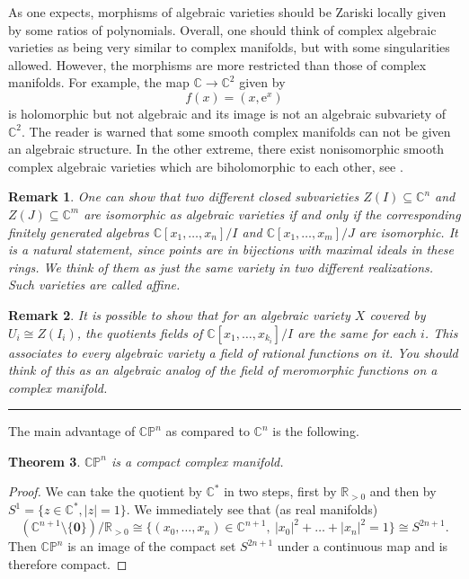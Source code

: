 \documentclass[11pt]{article}
\numberwithin{equation}{section}
\numberwithin{footnote}{section}
\newtheorem{thm}{Theorem}[section]
\newtheorem{rem}[thm]{Remark}
\newcommand{\blue}{\color{blue}}
\newcommand{\red}{\color{red}}
\newcommand{\ee}{{\mathrm e}}
\renewcommand{\P}{{\mathbb P}}
\newcommand{\R}{{\mathbb R}}
\newcommand{\C}{{\mathbb C}}
\begin{document}
\smallskip
As one expects, morphisms of algebraic varieties should be Zariski locally given by some ratios of polynomials. Overall, one should think of complex algebraic varieties as being very similar to complex manifolds, but with some singularities allowed. 
However, the morphisms are more restricted than those of complex manifolds. For example, the map $\C\to \C^2$ given by
$$
f(x) = (x,\ee^x)
$$
is holomorphic but not algebraic and its image is not an algebraic subvariety of $\C^2$. {\red The reader is warned that some smooth complex manifolds can not be given an algebraic structure. In the other extreme, there exist nonisomorphic smooth complex algebraic varieties which are biholomorphic to each other, see \cite{Hartshorne}.}

\smallskip
\begin{rem}
One can show that two different closed subvarieties $Z(I)\subseteq \C^n$ and $Z(J)\subseteq \C^m$ are isomorphic 
as algebraic varieties if and only if the corresponding finitely generated algebras $\C[x_1,\ldots,x_n]/I$ and $\C[x_1,\ldots, x_m]/J$ are isomorphic. It is a natural statement, since points are in bijections with maximal ideals in these rings.  
We think of them as just the same variety in two different realizations. Such varieties are called {\blue affine}.
\end{rem}

\smallskip
\begin{rem}
It is possible to show that for an algebraic variety $X$ covered by $U_i\cong Z(I_i)$, the quotients fields
of $\C[x_1,\ldots,x_{k_i}]/I$ are the same for each $i$. This associates to every algebraic variety a field of rational functions on it. You should think of this as an algebraic analog of the field of meromorphic functions on a complex manifold.
\end{rem}

\smallskip
{\blue \hrule}
The main advantage of $\C\P^n$ as compared to $\C^n$ is the following.

\smallskip
\begin{thm}
$\C\P^n$ is a compact complex manifold.
\end{thm}

\begin{proof}
We can take the quotient by $\C^*$ in two steps, first by $\R_{>0}$ and then by $S^1=\{z\in \C^*,|z|=1\}$. We immediately see that 
(as real manifolds)
$$
(\C^{n+1}\setminus\{{\mathbf 0}\})/\R_{>0}\cong \{(x_0,\ldots,x_n)\in \C^{n+1},~|x_0|^2 + \ldots + |x_n|^2 = 1\} \cong S^{2n+1}.
$$
Then $\C\P^n$ is an image of the compact set $S^{2n+1}$ under a continuous map and is therefore compact.
\end{proof}
\end{document}
